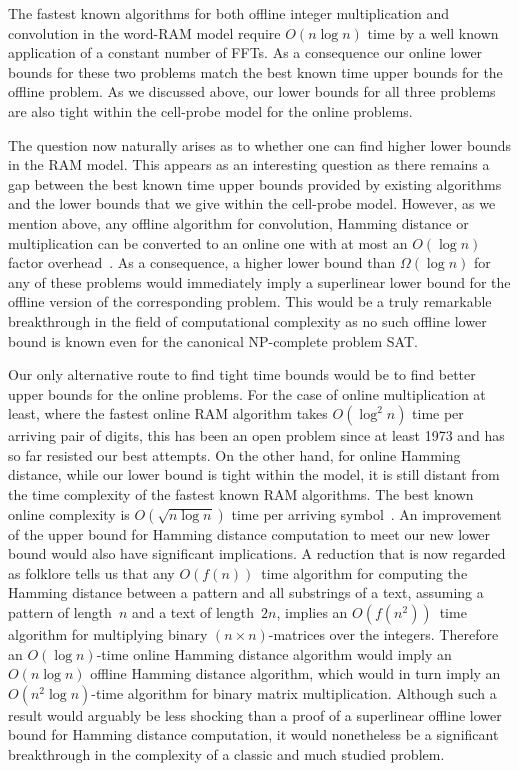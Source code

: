 \documentclass[11pt]{article}
\numberwithin{equation}{section}
\theoremstyle{definition}
\theoremstyle{plain}
\newcommand{\cclass}[1]{\textsf{#1}}
\begin{document}
The fastest known algorithms for both offline integer multiplication and convolution in the word-RAM model require $O(n\log{n})$ time by a well known application of a constant number of FFTs.  As a consequence our online lower bounds for these two problems match the best known time upper bounds for the offline problem. As we discussed above, our lower bounds for all three problems are also tight within the cell-probe model for the online problems.   

The question now naturally arises as to whether one can find higher lower bounds in the RAM model.   This appears as an interesting question as there remains a gap between the best known time upper bounds provided by existing algorithms and the lower bounds that we give within the cell-probe model.  However, as we mention above, any offline algorithm for convolution, Hamming distance or multiplication can be converted to an online one with at most an $O(\log{n})$ factor overhead~\cite{FS:1973,CEPP:2011}.
As a consequence, a higher lower bound than $\Omega(\log{n})$ for any of these problems would immediately imply a superlinear lower bound for the offline version of the corresponding problem. This would be a truly remarkable breakthrough in the field of computational complexity as no such offline lower bound is known even for the canonical \cclass{NP}-complete problem SAT.

Our only alternative route to find tight time bounds would be to find better upper bounds for the online problems. For the case of online multiplication at least, where the fastest online RAM algorithm takes $O(\log^2{n})$ time per arriving pair of digits, this has been an open problem since at least 1973 and has so far resisted our best attempts.
%
%
%
On the other hand, for online Hamming distance, while our lower bound is tight within the model, it is still distant from the time complexity of the fastest known RAM algorithms. The best known online complexity is $O(\sqrt{n\log{n}})$ time per arriving symbol~\cite{CEPP:2011}. An improvement of the upper bound for Hamming  distance computation to meet our new lower bound would also have significant implications. A reduction that is now regarded as folklore tells us that any $O(f(n))$~time algorithm for computing the Hamming distance between a pattern and all substrings of a text, assuming a pattern of length~$n$ and a text of length~$2n$, implies an $O(f(n^2))$~time algorithm for multiplying binary $(n\!\times\! n)$-matrices over the integers. Therefore an
%
$O(\log{n})$-time    %
online Hamming distance algorithm would imply an $O(n\log{n})$  offline Hamming distance algorithm, which would in turn imply an
%
$O(n^2\log{n})$-time     %
algorithm for binary matrix multiplication.  Although such a result would arguably be less shocking than a proof of a superlinear offline lower bound for Hamming distance computation, it would nonetheless be a significant breakthrough in the complexity of a classic and much studied problem.
\end{document}
